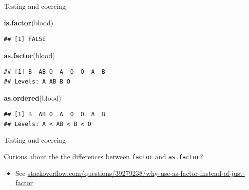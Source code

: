 \documentclass[ignorenonframetext,]{beamer}
\newenvironment{Shaded}{\begin{snugshade}}{\end{snugshade}}
\newcommand{\KeywordTok}[1]{\textcolor[rgb]{0.13,0.29,0.53}{\textbf{#1}}}
\newcommand{\NormalTok}[1]{#1}
\providecommand{\tightlist}{%
  \setlength{\itemsep}{0pt}\setlength{\parskip}{0pt}}
\begin{document}
\begin{frame}[fragile]{Testing and coercing}
\protect\hypertarget{testing-and-coercing-1}{}

\begin{Shaded}
\begin{Highlighting}[]
\KeywordTok{is.factor}\NormalTok{(blood)}
\end{Highlighting}
\end{Shaded}

\begin{verbatim}
## [1] FALSE
\end{verbatim}

\begin{Shaded}
\begin{Highlighting}[]
\KeywordTok{as.factor}\NormalTok{(blood)}
\end{Highlighting}
\end{Shaded}

\begin{verbatim}
## [1] B  AB O  A  O  O  A  B 
## Levels: A AB B O
\end{verbatim}

\begin{Shaded}
\begin{Highlighting}[]
\KeywordTok{as.ordered}\NormalTok{(blood)}
\end{Highlighting}
\end{Shaded}

\begin{verbatim}
## [1] B  AB O  A  O  O  A  B 
## Levels: A < AB < B < O
\end{verbatim}

\end{frame}

\begin{frame}[fragile]{Testing and coercing}
\protect\hypertarget{testing-and-coercing-2}{}

Curious about the the differences between \texttt{factor} and
\texttt{as.factor}?

\begin{itemize}
\tightlist
\item
  See
  \href{https://stackoverflow.com/questions/39279238/why-use-as-factor-instead-of-just-factor}{stackoverflow.com/questions/39279238/why-use-as-factor-instead-of-just-factor}
\end{itemize}

\end{frame}
\end{document}
